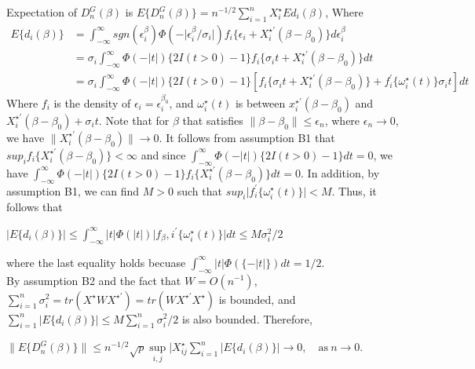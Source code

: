 \documentclass[titlepage,english,12pt]{article}
\begin{document}
	\noindent Expectation of $D_n^G(\beta)$ is
	$E\{D_n^G(\beta)\}=n^{-1/2}\sum_{i=1}^{n}X_i^\star E{d_i(\beta)}$,
	\noindent Where 
	\begin{align*}
	E\{d_i(\beta)\} & = \int_{-\infty}^{\infty}sgn(\epsilon_i^\beta)\Phi(-\lvert\epsilon_i^\beta/\sigma_i\rvert)f_i\{\epsilon_i+X_i^{\star \prime}(\beta-\beta_0)\}d\epsilon_i^\beta\\
	& = \sigma_i \int_{-\infty}^{\infty}\Phi(-\lvert t \rvert)\{2I(t>0)-1\}f_i\{\sigma_i t + X_i^{\star \prime}(\beta-\beta_0)\}dt\\
	& = \sigma_i \int_{-\infty}^{\infty}\Phi(-\lvert t \rvert)\{2I(t>0)-1\}[f_i\{\sigma_i t + X_i^{\star \prime}(\beta-\beta_0)\}+f_i^\prime\{\omega_i^\star(t)\}\sigma_i t]dt
	\end{align*}
	\noindent Where $f_i$ is the density of $\epsilon_i=\epsilon_i^{\beta_0}$, and $\omega_i^\star(t)$ is between $x_i^{\star \prime} (\beta-\beta_0)$ and $X_i^{\star \prime} (\beta-\beta_0)+\sigma_i t$. Note that for $\beta$ that satisfies $\lVert \beta-\beta_0 \rVert \leq \epsilon_n$, where $\epsilon_n \to 0$, we have $\lVert X_i^{\star \prime} (\beta-\beta_0) \rVert \to 0$. It follows from assumption B1 that $sup_i f_i \{X_i^{\star \prime} (\beta-\beta_0)\}<\infty$ and since $\int_{-\infty}^{\infty} \Phi(-\lvert t \rvert)\{2I(t>0)-1\}dt=0$, we have $\int_{-\infty}^{\infty} \Phi(-\lvert t \rvert)\{2I(t>0)-1\}f_i \{X_i^{\star \prime} (\beta-\beta_0)\}dt=0$. In addition, by assumption B1, we can find $M>0$ such that $sup_i \lvert f_i^\prime \{\omega_i^\star (t)\}\rvert<M$. Thus, it follows that\\
	
	\begin{center}
	$\lvert E\{d_i(\beta)\} \rvert \leq \int_{-\infty}^{\infty} \lvert t \rvert \Phi(\lvert t \rvert) \lvert f_\beta, i ^\prime \{\omega_i^\star(t)\}\rvert dt \leq M \sigma_i^2 /2$
	\end{center}
	
	\noindent where the last equality holds becuase $\int_{-\infty}^{\infty} \lvert t \rvert \Phi (\{-\lvert t \rvert\})dt=1/2$.\\
	
	\noindent By assumption B2 and the fact that $W=O(n^{-1})$, $\sum_{i=1}^{n} \sigma_i^2=tr(X^\star W X^{\star \prime})=tr(W X^{\star \prime}X^\star)$ is bounded, and $\sum_{i=1}^{n} \lvert E\{d_i(\beta)\} \rvert \leq M \sum_{i=1}^{n}\sigma_i^2 /2$ is also bounded. Therefore,
	
	\begin{center}
	$\lVert E\{D_n^G(\beta)\} \rVert \leq n^{-1/2} \sqrt{p} \sup\limits_{i,j} \lvert X_{ij}^{\star} \sum_{i=1}^{n} \lvert E\{d_i(\beta)\} \rvert \to 0,\quad \text{as}\ n\to 0.$
	\end{center}
	
\end{document}
